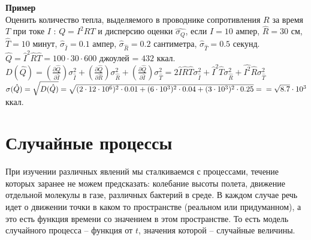 \documentclass[russian, 12pt, fleqn,x11names]{article}
\begin{document}
\textbf{Пример} \\
Оценить количество тепла, выделяемого в проводнике сопротивления $R$ за время $T$ при токе $I$ : $Q=I^2RT$ и дисперсию оценки $\hat{\sigma_Q}$, если $I=10$ ампер, $\hat{R} = 30$ см, $\hat{T} = 10$ минут, $\hat{\sigma}_{\hat{I}} = 0.1$ ампер, $\hat{\sigma}_{\hat{R}} = 0.2$ сантиметра, $\hat{\sigma}_{\hat{T}} = 0.5$ секунд.\\
$\hat{Q} = \hat{I}^2 \hat{R} \hat{T} = 100\cdot30\cdot600$ джоулей = $432$ ккал.\\
$D(\hat{Q}) = (\frac{\partial \hat{Q}}{\partial \hat{I}}) \sigma^2_{\hat{I}} + (\frac{\partial \hat{Q}}{\partial \hat{R}}) \sigma^2_{\hat{R}} + (\frac{\partial \hat{Q}}{\partial \hat{I}}) \sigma^2_{\hat{T}} = 2\hat{I}\hat{R}\hat{T} \sigma_{\hat{I}}^2 + \hat{I}^2\hat{T} \sigma_{\hat{R}}^2  + \hat{I^2}\hat{R}\sigma_{\hat{T}}^2$\\
$\sigma(\hat{Q}) = \sqrt{D(\hat{Q})} = \sqrt{(2\cdot12\cdot 10^6)^2\cdot 0.01 + (6\cdot 10^3)^2 \cdot 0.04 + (3 \cdot 10^3)^2 \cdot 0.25} = \\ = \sqrt{8.7} \cdot 10^3$ ккал.
\newpage
\section{Случайные процессы}
\noindent
При изучении различных явлений мы сталкиваемся с процессами, течение которых заранее не можем предсказать: колебание высоты полета, движение отдельной молекулы в газе, различных бактерий в %
среде. В каждом случае речь идет о движении точки в каком то пространстве (реальном или придуманном), а это есть функция времени со значением в этом пространстве.
То есть модель случайного процесса -- функция от $t$, значения которой -- случайные величины.\\
\end{document}

